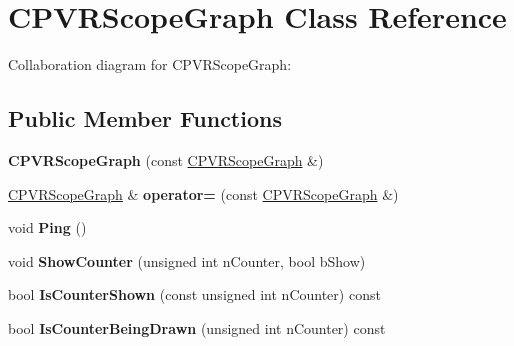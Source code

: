 \hypertarget{class_c_p_v_r_scope_graph}{\section{C\+P\+V\+R\+Scope\+Graph Class Reference}
\label{class_c_p_v_r_scope_graph}
}


Collaboration diagram for C\+P\+V\+R\+Scope\+Graph\+:
\subsection*{Public Member Functions}
\begin{DoxyCompactItemize}
\item 
\hypertarget{class_c_p_v_r_scope_graph_a503310d978000b239bd44f2d5d2eded9}{{\bfseries C\+P\+V\+R\+Scope\+Graph} (const \hyperlink{class_c_p_v_r_scope_graph}{C\+P\+V\+R\+Scope\+Graph} \&)}\label{class_c_p_v_r_scope_graph_a503310d978000b239bd44f2d5d2eded9}

\item 
\hypertarget{class_c_p_v_r_scope_graph_ac0e365d03da29d227df4805c73f23568}{\hyperlink{class_c_p_v_r_scope_graph}{C\+P\+V\+R\+Scope\+Graph} \& {\bfseries operator=} (const \hyperlink{class_c_p_v_r_scope_graph}{C\+P\+V\+R\+Scope\+Graph} \&)}\label{class_c_p_v_r_scope_graph_ac0e365d03da29d227df4805c73f23568}

\item 
\hypertarget{class_c_p_v_r_scope_graph_a1addbc7240e56142e762cdcce0573e01}{void {\bfseries Ping} ()}\label{class_c_p_v_r_scope_graph_a1addbc7240e56142e762cdcce0573e01}

\item 
\hypertarget{class_c_p_v_r_scope_graph_a07d9a7ae1f382e55f0aec2010b032065}{void {\bfseries Show\+Counter} (unsigned int n\+Counter, bool b\+Show)}\label{class_c_p_v_r_scope_graph_a07d9a7ae1f382e55f0aec2010b032065}

\item 
\hypertarget{class_c_p_v_r_scope_graph_acf0be7111ad97b0c0b82c475cff21349}{bool {\bfseries Is\+Counter\+Shown} (const unsigned int n\+Counter) const }\label{class_c_p_v_r_scope_graph_acf0be7111ad97b0c0b82c475cff21349}

\item 
\hypertarget{class_c_p_v_r_scope_graph_a0cc8949a4e03c381cbd5340b8183fecd}{bool {\bfseries Is\+Counter\+Being\+Drawn} (unsigned int n\+Counter) const }\label{class_c_p_v_r_scope_graph_a0cc8949a4e03c381cbd5340b8183fecd}


\end{DoxyCompactItemize}
